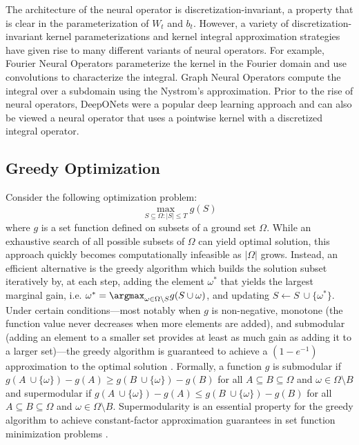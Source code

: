 \documentclass{article} %
\begin{document}
The architecture of the neural operator is discretization-invariant, a property that is clear in the parameterization of $W_t$ and $b_t$. However, a variety of discretization-invariant kernel parameterizations and kernel integral approximation strategies have given rise to many different variants of neural operators.  
For example, Fourier Neural Operators \citep{li2020fourier} parameterize the kernel in the Fourier domain and use convolutions to characterize the integral. Graph Neural Operators \citep{li2020multipole} compute the integral over a subdomain using the Nystrom's approximation. Prior to the rise of neural operators, DeepONets \citep{lu2021learning} were a popular deep learning approach and can also be viewed a neural operator that uses a pointwise kernel with a discretized integral operator. 

\subsection{Greedy Optimization} \label{sec:bggreedy}

Consider the following optimization problem:
$$\max_{S \subseteq \Omega: |S| \leq T} g(S)$$
where $g$ is a set function defined on subsets of a ground set $\Omega$. While an exhaustive search of all possible subsets of $\Omega$ can yield  optimal solution, this approach quickly becomes computationally infeasible as $|\Omega|$ grows. Instead, an efficient alternative is the greedy algorithm which builds the solution subset iteratively by, at each step, adding the element $\omega^*$ that yields the largest marginal gain, i.e. $\omega^* =  \argmax_{\omega \in \Omega \setminus S} g(S \cup \omega)$, and updating $S \leftarrow S \ \cup \{\omega^*\}$. Under certain conditions—most notably when $g$ is non-negative, monotone (the function value never decreases when more elements are added), and submodular (adding an element to a smaller set provides at least as much gain as adding it to a larger set)—the greedy algorithm is guaranteed to achieve a $(1 - e^{-1})$ approximation to the optimal solution \citep{nemhauser1978analysis}. Formally, a function $g$ is submodular if $g(A \ \cup \{\omega\}) - g(A) \geq g(B \ \cup \{\omega\}) - g(B)$ for all $A \subseteq B \subseteq \Omega$ and $\omega \in \Omega \setminus B$ and supermodular if $g(A \ \cup \{\omega\}) - g(A) \leq g(B \ \cup \{\omega\}) - g(B)$ for all $A \subseteq B \subseteq \Omega$ and $\omega \in \Omega \setminus B$. Supermodularity is an essential property for the greedy algorithm to achieve constant-factor approximation guarantees in set function minimization problems \citep{liberty2017greedy}.
\end{document}
